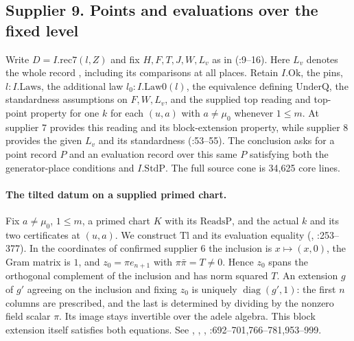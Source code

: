\subsection{Supplier 9. Points and evaluations over the fixed level}
\label{r12:s9}
Write $D=I.\mathrm{rec7}(l,Z)$ and fix $H,F,T,J,W,L_v$ as in
(:9--16).
Here $L_v$ denotes the whole record , including its comparisons at
all places. Retain $I.\mathrm{Ok}$, the pins, $l:I.\mathrm{Laws}$,
the additional law $l_0:I.\mathrm{Law0}(l)$, the
equivalence defining $\mathrm{UnderQ}$, the standardness assumptions
on $F,W,L_v$, and the supplied top reading and top-point property for
one $k$ for each $(u,a)$ with $a\ne\mu_0$ whenever $1\le m$.
At  supplier 7 provides this reading and its
block-extension property, while supplier 8 provides the given $L_v$
and its standardness (:53--55).
The conclusion asks for a
point record $P$ and an evaluation record over this same $P$ satisfying
both the generator-place conditions and $I.\mathrm{StdP}$. The full
source cone is 34,625 core lines.

\paragraph{The tilted datum on a supplied primed chart.}
Fix $a\ne\mu_0$, $1\le m$, a primed chart $K$ with its
$\mathrm{ReadsP}$, and the actual $k$ and its two certificates at
$(u,a)$. We construct $\mathrm{Tl}$ and its evaluation equality
(,
:253--377).
In the coordinates of confirmed supplier 6 the inclusion is $x\mapsto
(x,0)$, the Gram matrix is $1$, and $z_0=\pi e_{n+1}$ with
$\pi\bar\pi=T\ne0$. Hence $z_0$ spans the orthogonal complement
of the inclusion and has norm squared $T$. An extension $g$ of $g'$
agreeing on the inclusion and fixing $z_0$ is uniquely
$\operatorname{diag}(g',1)$: the first $n$ columns are prescribed,
and the last is determined by dividing by the nonzero field scalar
$\pi$. Its image stays invertible over the adele algebra. This block
extension itself satisfies both equations. See
,
,
, :692--701,766--781,953--999.

